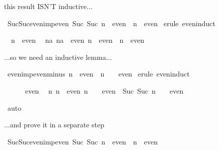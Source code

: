 \begin{isabellebody}
\begin{isamarkuptext}%
this result ISN'T inductive...%
\end{isamarkuptext}%
\ Suc{\isacharunderscore}Suc{\isacharunderscore}even{\isacharunderscore}imp{\isacharunderscore}even{\isacharcolon}\ {\isachardoublequote}Suc\ {\isacharparenleft}Suc\ n{\isacharparenright}\ {\isasymin}\ even\ {\isasymLongrightarrow}\ n\ {\isasymin}\ even{\isachardoublequote}\isanewline
{}\ {\isacharparenleft}erule\ even{\isachardot}induct{\isacharparenright}%
\begin{isamarkuptxt}%
\begin{isabelle}%
\ {}{\isachardot}\ n\ {\isasymin}\ even\isanewline
\ {}{\isachardot}\ {\isasymAnd}na{\isachardot}\ {\isasymlbrakk}na\ {\isasymin}\ even{\isacharsemicolon}\ n\ {\isasymin}\ even{\isasymrbrakk}\ {\isasymLongrightarrow}\ n\ {\isasymin}\ even%
\end{isabelle}%
\end{isamarkuptxt}%
%
\begin{isamarkuptext}%
...so we need an inductive lemma...%
\end{isamarkuptext}%
\ even{\isacharunderscore}imp{\isacharunderscore}even{\isacharunderscore}minus{\isacharunderscore}{}{\isacharcolon}\ {\isachardoublequote}n\ {\isasymin}\ even\ {\isasymLongrightarrow}\ n\ {\isacharminus}\ {}\ {\isasymin}\ even{\isachardoublequote}\isanewline
{}\ {\isacharparenleft}erule\ even{\isachardot}induct{\isacharparenright}%
\begin{isamarkuptxt}%
\begin{isabelle}%
\ {}{\isachardot}\ {}\ {\isacharminus}\ {}\ {\isasymin}\ even\isanewline
\ {}{\isachardot}\ {\isasymAnd}n{\isachardot}\ {\isasymlbrakk}n\ {\isasymin}\ even{\isacharsemicolon}\ n\ {\isacharminus}\ {}\ {\isasymin}\ even{\isasymrbrakk}\ {\isasymLongrightarrow}\ Suc\ {\isacharparenleft}Suc\ n{\isacharparenright}\ {\isacharminus}\ {}\ {\isasymin}\ even%
\end{isabelle}%
\end{isamarkuptxt}%
\ auto\isanewline
{}%
\begin{isamarkuptext}%
...and prove it in a separate step%
\end{isamarkuptext}%
\ Suc{\isacharunderscore}Suc{\isacharunderscore}even{\isacharunderscore}imp{\isacharunderscore}even{\isacharcolon}\ {\isachardoublequote}Suc\ {\isacharparenleft}Suc\ n{\isacharparenright}\ {\isasymin}\ even\ {\isasymLongrightarrow}\ n\ {\isasymin}\ even{\isachardoublequote}\isanewline

\end{isabellebody}
